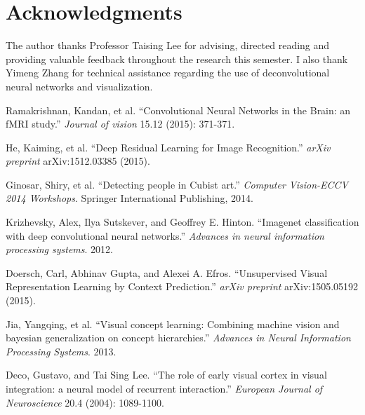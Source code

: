 \documentclass[11pt]{article}
\begin{document}
\section*{Acknowledgments}
The author thanks Professor Taising Lee for advising, directed reading and providing valuable feedback throughout the research this semester. I also thank Yimeng Zhang for technical assistance regarding the use of deconvolutional neural networks and visualization.

\begin{thebibliography}{9}
\small

Ramakrishnan, Kandan, et al. 
``Convolutional Neural Networks in the Brain: an fMRI study.''
{\em Journal of vision} 15.12 (2015): 371-371.

He, Kaiming, et al. 
``Deep Residual Learning for Image Recognition.''
{\em arXiv preprint} arXiv:1512.03385 (2015).

Ginosar, Shiry, et al. 
``Detecting people in Cubist art.''
{\em Computer Vision-ECCV 2014 Workshops}. Springer International Publishing, 2014.

Krizhevsky, Alex, Ilya Sutskever, and Geoffrey E. Hinton. 
``Imagenet classification with deep convolutional neural networks.''
{\em Advances in neural information processing systems}. 2012.

Doersch, Carl, Abhinav Gupta, and Alexei A. Efros.
``Unsupervised Visual Representation Learning by Context Prediction.''
{\em arXiv preprint} arXiv:1505.05192 (2015).

Jia, Yangqing, et al.
``Visual concept learning: Combining machine vision and bayesian generalization on concept hierarchies.''
{\em Advances in Neural Information Processing Systems}. 2013.

Deco, Gustavo, and Tai Sing Lee.
``The role of early visual cortex in visual integration: a neural model of recurrent interaction.''
{\em European Journal of Neuroscience} 20.4 (2004): 1089-1100.

\end{thebibliography}
\end{document}
